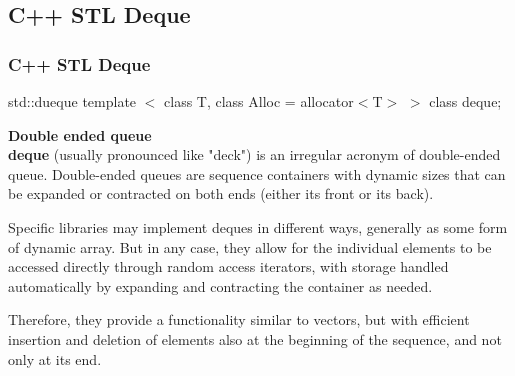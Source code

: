 \documentclass{beamer}
\begin{document}
\subsection{C++ STL Deque} 

\begin{frame}
\frametitle{C++ STL Deque}

\begin{block}{std::dueque}
template $<$ class T, class Alloc = allocator$<$T$>$ $>$ class deque;
\end{block}

\textbf{Double ended queue}\\

\textbf{deque} (usually pronounced like "deck") is an irregular acronym of double-ended queue. Double-ended queues are sequence containers with dynamic sizes that can be expanded or contracted on both ends (either its front or its back).

Specific libraries may implement deques in different ways, generally as some form of dynamic array. But in any case, they allow for the individual elements to be accessed directly through random access iterators, with storage handled automatically by expanding and contracting the container as needed.

Therefore, they provide a functionality similar to vectors, but with efficient insertion and deletion of elements also at the beginning of the sequence, and not only at its end. 

\end{frame}
\end{document}
